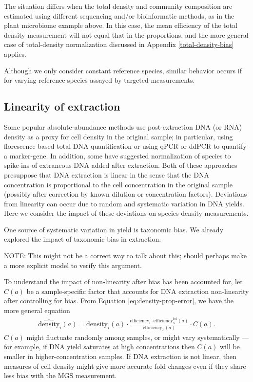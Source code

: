\documentclass[
]{article}
\begin{document}
The situation differs when the total density and community composition are estimated using different sequencing and/or bioinformatic methods, as in the plant microbiome example above.
In this case, the mean efficiency of the total density measurement will not equal that in the proportions, and the more general case of total-density normalization discussed in Appendix \ref{total-density-bias} applies.

Although we only consider constant reference species, similar behavior occurs if for varying reference species assayed by targeted measurements.

\hypertarget{linearity-of-extraction}{%
\subsection{Linearity of extraction}\label{linearity-of-extraction}}

Some popular absolute-abundance methods use post-extraction DNA (or RNA) density as a proxy for cell density in the original sample; in particular, using florescence-based total DNA quantification or using qPCR or ddPCR to quantify a marker-gene.
In addition, some have suggested normalization of species to spike-ins of extraneous DNA added after extraction.
Both of these approaches presuppose that DNA extraction is linear in the sense that the DNA concentration is proportional to the cell concentration in the original sample (possibly after correction by known dilution or concentration factors).
Deviations from linearity can occur due to random and systematic variation in DNA yields.
Here we consider the impact of these deviations on species density measurements.

One source of systematic variation in yield is taxonomic bias.
We already explored the impact of taxonomic bias in extraction.

NOTE: This might not be a correct way to talk about this; should perhaps make a more explicit model to verify this argument.

To understand the impact of non-linearity after bias has been accounted for, let \(C(a)\) be a sample-specific factor that accounts for DNA extraction non-linearity after controlling for bias.
From Equation \eqref{eq:density-prop-error}, we have the more general equation
\begin{align}
  \label{eq:app-density-prop-error}
  \widehat{\text{density}}_{i}(a) 
  = \text{density}_{i}(a) \cdot \frac{\text{efficiency}_{i} \cdot \text{efficiency}^{\text{tot}}_S(a)}{\text{efficiency}_S(a)} \cdot C(a).
\end{align}
\(C(a)\) might fluctuate randomly among samples, or might vary systematically --- for example, if DNA yield saturates at high concentrations then \(C(a)\) will be smaller in higher-concentration samples.
If DNA extraction is not linear, then measures of cell density might give more accurate fold changes even if they share less bias with the MGS measurement.
\end{document}
